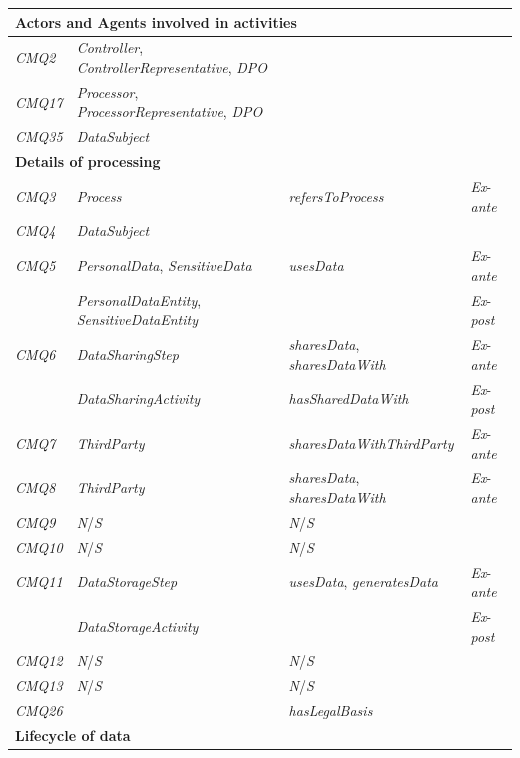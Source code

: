 \begin{center}
\begin{tabularx}{\textwidth}{|l|X|p{5cm}|l|}
\multicolumn{4}{|l|}{\textbf{Actors and Agents involved in activities}}  \\ \hline
\textit{CMQ2} & \textit{Controller}, \textit{ControllerRepresentative}, \textit{DPO} &  &  \\ \hline
\textit{CMQ17} & \textit{Processor}, \textit{ProcessorRepresentative}, \textit{DPO} &  &  \\ \hline
\textit{CMQ35} & \textit{DataSubject} &  &  \\ \hline
\multicolumn{4}{|l|}{\textbf{Details of processing}}  \\ \hline
\textit{CMQ3} & \textit{Process} & \textit{refersToProcess} & \textit{Ex}-\textit{ante} \\ \hline
\textit{CMQ4} & \textit{DataSubject} &  &  \\ \hline
\textit{CMQ5} & \textit{PersonalData}, \textit{SensitiveData} & \textit{usesData} & \textit{Ex}-\textit{ante} \\ \hline
 & \textit{PersonalDataEntity}, \textit{SensitiveDataEntity} &  & \textit{Ex}-\textit{post} \\ \hline
\textit{CMQ6} & \textit{DataSharingStep} & \textit{sharesData}, \textit{sharesDataWith} & \textit{Ex}-\textit{ante} \\ \hline
 & \textit{DataSharingActivity} & \textit{hasSharedDataWith} & \textit{Ex}-\textit{post} \\ \hline
\textit{CMQ7} & \textit{ThirdParty} & \textit{sharesDataWithThirdParty} & \textit{Ex}-\textit{ante} \\ \hline
\textit{CMQ8} & \textit{ThirdParty} & \textit{sharesData}, \textit{sharesDataWith} & \textit{Ex}-\textit{ante} \\ \hline
\textit{CMQ9} & \textit{N}/\textit{S} & \textit{N}/\textit{S} &  \\ \hline
\textit{CMQ10} & \textit{N}/\textit{S} & \textit{N}/\textit{S} &  \\ \hline
\textit{CMQ11} & \textit{DataStorageStep} & \textit{usesData}, \textit{generatesData} & \textit{Ex}-\textit{ante} \\ \hline
 & \textit{DataStorageActivity} &  & \textit{Ex}-\textit{post} \\ \hline
\textit{CMQ12} & \textit{N}/\textit{S} & \textit{N}/\textit{S} &  \\ \hline
\textit{CMQ13} & \textit{N}/\textit{S} & \textit{N}/\textit{S} &  \\ \hline
\textit{CMQ26} &  & \textit{hasLegalBasis} &  \\ \hline
\multicolumn{4}{|l|}{\textbf{Lifecycle of data}} \\ \hline

\end{tabularx}
\end{center}
